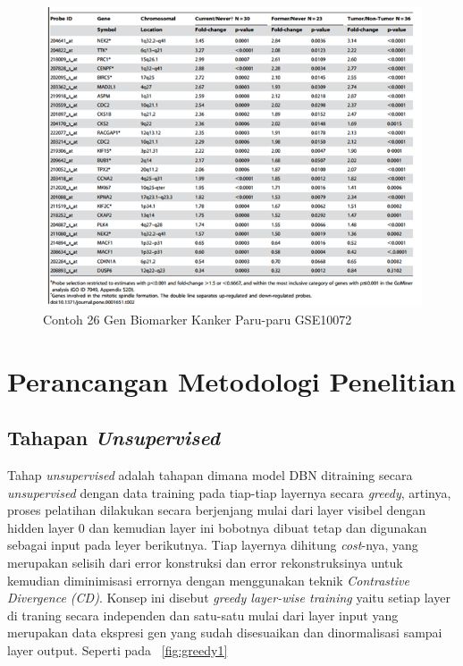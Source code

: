 \begin{figure}
	\centering
	\includegraphics[width=1\textwidth]
		{pics/biomarker.png}
	\caption{Contoh 26 Gen Biomarker Kanker Paru-paru GSE10072 \citep{landi2008gene}}
	\label{fig:biomarker}
\end{figure}


\section{Perancangan Metodologi Penelitian}

\subsection{Tahapan \textit{Unsupervised}}
Tahap \textit{unsupervised} adalah tahapan dimana model DBN ditraining secara \textit{unsupervised} dengan data training pada tiap-tiap layernya secara \textit{greedy}, artinya, proses pelatihan dilakukan secara berjenjang mulai dari layer visibel dengan hidden layer 0 dan kemudian layer ini bobotnya dibuat tetap dan digunakan sebagai input pada leyer berikutnya. Tiap layernya dihitung \textit{cost}-nya, yang merupakan selisih dari error konstruksi dan error rekonstruksinya \citep{hinton2006fast} untuk kemudian diminimisasi errornya dengan menggunakan teknik \textit{Contrastive Divergence (CD)}. Konsep ini disebut \textit{greedy layer-wise training} yaitu setiap layer di traning secara independen dan satu-satu mulai dari layer input yang merupakan data ekspresi gen yang sudah disesuaikan dan dinormalisasi sampai layer output. Seperti pada \pic~\ref{fig:greedy1}

